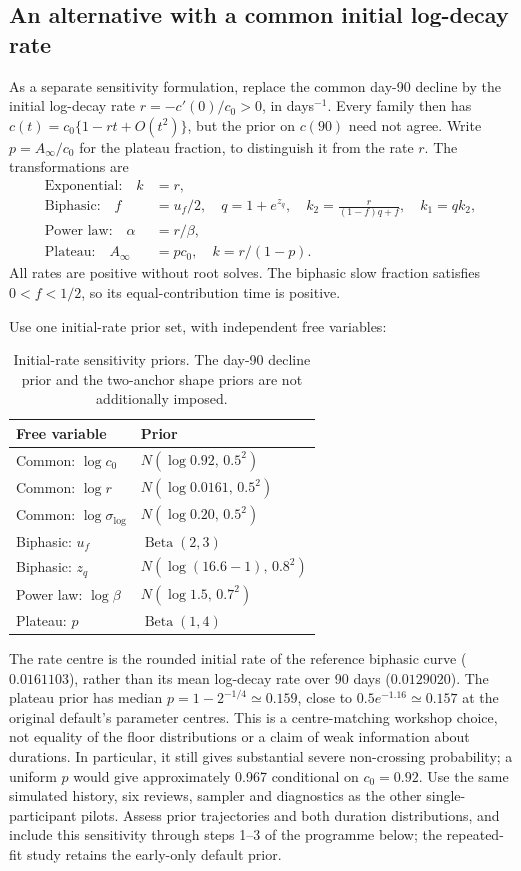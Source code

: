 \documentclass[11pt,a4paper]{article}
\begin{document}
\subsection*{An alternative with a common initial log-decay rate}

As a separate sensitivity formulation, replace the common day-90 decline
by the initial log-decay rate $r=-c'(0)/c_0>0$, in days$^{-1}$. Every
family then has $c(t)=c_0\{1-rt+O(t^2)\}$, but the prior on $c(90)$
need not agree. Write $p=A_\infty/c_0$ for the plateau fraction, to
distinguish it from the rate $r$. The transformations are
\begin{align}
  \text{Exponential:}\quad k&=r, \\
  \text{Biphasic:}\quad f&=u_f/2,\quad q=1+e^{z_q},\quad
    k_2=\frac{r}{(1-f)q+f},\quad k_1=qk_2, \\
  \text{Power law:}\quad \alpha&=r/\beta, \\
  \text{Plateau:}\quad A_\infty&=pc_0,\quad k=r/(1-p).
\end{align}
All rates are positive without root solves. The biphasic slow fraction
satisfies $0<f<1/2$, so its equal-contribution time is positive.

Use one initial-rate prior set, with independent free variables:
\begin{table}[H]
\centering\small
\caption{Initial-rate sensitivity priors. The day-90 decline prior and
the two-anchor shape priors are not additionally imposed.}
\label{tab:initial-rate-priors}
\begin{tabular}{@{}ll@{}}
\toprule
Free variable & Prior \\
\midrule
Common: $\log c_0$ & $N(\log0.92,\,0.5^2)$ \\
Common: $\log r$ & $N(\log0.0161,\,0.5^2)$ \\
Common: $\log\sigma_{\log}$ & $N(\log0.20,\,0.5^2)$ \\
Biphasic: $u_f$ & $\operatorname{Beta}(2,3)$ \\
Biphasic: $z_q$ & $N(\log(16.6-1),\,0.8^2)$ \\
Power law: $\log\beta$ & $N(\log1.5,\,0.7^2)$ \\
Plateau: $p$ & $\operatorname{Beta}(1,4)$ \\
\bottomrule
\end{tabular}
\end{table}
The rate centre is the rounded initial rate of the reference biphasic
curve ($0.0161103$), rather than its mean log-decay rate over 90 days
($0.0129020$). The plateau prior has median $p=1-2^{-1/4}\simeq0.159$,
close to $0.5e^{-1.16}\simeq0.157$ at the original default's parameter
centres. This is a centre-matching workshop choice, not equality of the
floor distributions or a claim of weak information about durations.
In particular, it still gives substantial severe non-crossing probability;
a uniform $p$ would give approximately 0.967 conditional on $c_0=0.92$.
Use the same simulated history, six reviews, sampler and diagnostics as
the other single-participant pilots. Assess prior trajectories and both
duration distributions, and include this sensitivity through steps 1--3
of the programme below; the repeated-fit study retains the early-only
default prior.
\end{document}
